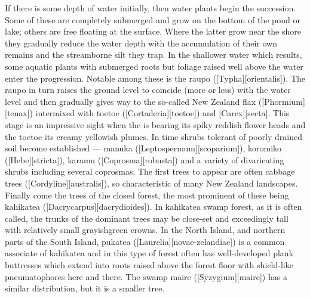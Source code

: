 If there is some depth of water initially, then water plants begin the succession.
Some of these are completely submerged and grow on the bottom of the pond or lake; others are free floating at the surface.
Where the latter grow near the shore they gradually reduce the water depth with the accumulation of their own remains and the streamborne silt they trap.
In the shallower water which results, some aquatic plants with submerged roots but foliage raised well above the water enter the progression.
Notable among these is the raupo ([Typha][orientalis]).
The raupo in turn raises the ground level to coincide (more or less) with the water level and then gradually gives way to the so-called New Zealand flax ([Phormium][tenax]) intermixed with toetoe ([Cortaderia][toetoe]) and [Carex][secta].
This stage is an impressive sight when the  is bearing its spiky reddish flower heads and the toetoe its creamy yellowish plumes.
In time shrubs tolerant of poorly drained soil become established --- manuka ([Leptospermum][scoparium]), koromiko ([Hebe][stricta]), karamu ([Coprosma][robusta]) and a variety of divaricating shrubs including several coprosmas.
The first trees to appear are often cabbage trees ([Cordyline][australis]), so characteristic of many New Zealand landscapes.
Finally come the trees of the closed forest, the most prominent of these being kahikatea ([Dacrycarpus][dacrydioides]).
In kahikatea swamp forest, as it is often called, the trunks of the dominant trees may be close-set and exceedingly tall with relatively small grayishgreen crowns.
In the North Island, and northern parts of the South Island, pukatea ([Laurelia][novae-zelandiae]) is a common associate of kahikatea and in this type of forest often has well-developed plank buttresses which extend into roots raised above the forest floor with shield-like pneumatophores here and there.
The swamp maire ([Syzygium][maire]) has a similar distribution, but it is a smaller tree.

